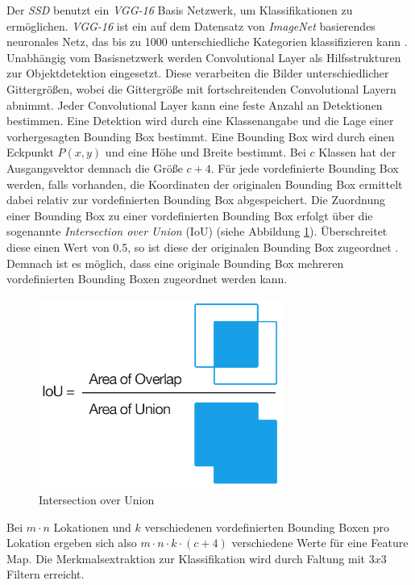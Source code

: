 Der \textit{SSD} benutzt ein \textit{VGG-16} Basis Netzwerk, um Klassifikationen zu ermöglichen. \textit{VGG-16} ist ein auf dem Datensatz von \textit{ImageNet} basierendes neuronales Netz, das bis zu 1000 unterschiedliche Kategorien klassifizieren kann \cite{MathWorks.2019b}. Unabhängig vom Basisnetzwerk werden Convolutional Layer als Hilfsstrukturen zur Objektdetektion eingesetzt. Diese verarbeiten die Bilder unterschiedlicher Gittergrößen, wobei die Gittergröße mit fortschreitenden Convolutional Layern abnimmt. Jeder Convolutional Layer kann eine feste Anzahl an Detektionen bestimmen. Eine Detektion wird durch eine Klassenangabe und die Lage einer vorhergesagten Bounding Box bestimmt. Eine Bounding Box wird durch einen Eckpunkt $P(x,y)$ und eine Höhe und Breite bestimmt. Bei $c$ Klassen hat der Ausgangsvektor demnach die Größe $c+4$. Für jede vordefinierte Bounding Box werden, falls vorhanden, die Koordinaten der originalen Bounding Box ermittelt dabei relativ zur vordefinierten Bounding Box abgespeichert. Die Zuordnung einer Bounding Box zu einer vordefinierten Bounding Box erfolgt über die sogenannte \textit{Intersection over Union} (IoU) (siehe Abbildung \ref{iou}). Überschreitet diese einen Wert von 0.5, so ist diese der originalen Bounding Box zugeordnet \cite{ssd.20161229}. Demnach ist es möglich, dass eine originale Bounding Box mehreren vordefinierten Bounding Boxen zugeordnet werden kann. \cite{ssd.20161229} 

\begin{figure}[ht]
	\begin{center}
		\includegraphics[width=8cm]{Bilder/iou_equation.png} 
		\caption[Intersection over Union]{Intersection over Union \cite{AdrianRosebrock.20161107}}
		\label{iou}
	\end{center}
\end{figure}

Bei $m \cdot n$ Lokationen und $k$ verschiedenen vordefinierten Bounding Boxen pro Lokation ergeben sich also $m \cdot n \cdot k \cdot (c+4)$ verschiedene Werte für eine Feature Map. Die Merkmalsextraktion zur Klassifikation wird durch Faltung mit $3x3$ Filtern erreicht. \cite{ssd.20161229} 

